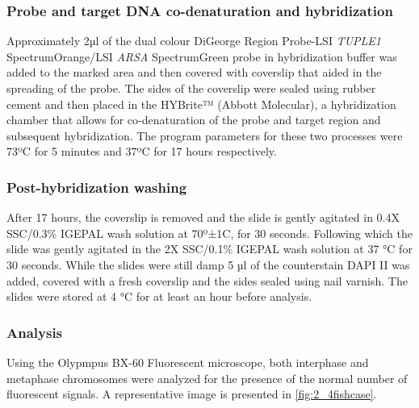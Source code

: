 \begin{refsection}
\subsubsection{Probe and target DNA co-denaturation and hybridization}
Approximately 2µl of the dual colour DiGeorge Region Probe-LSI \textit{TUPLE1} SpectrumOrange/LSI \textit{ARSA} SpectrumGreen probe in hybridization buffer was added to the marked area and then covered with coverslip that aided in the spreading of the probe. The sides of the coverslip were sealed using rubber cement and then placed in the HYBrite™ (Abbott Molecular), a hybridization chamber that allows for co-denaturation of the probe and target region and subsequent hybridization. The program parameters for these two processes were 73ºC for 5 minutes and 37ºC for 17 hours respectively.

\subsubsection{Post-hybridization washing}

After 17 hours, the coverslip is removed and the slide is gently agitated in 0.4X SSC/0.3\% IGEPAL wash solution at 70º±1C, for 30 seconds. Following which the slide was gently agitated in the 2X SSC/0.1\% IGEPAL wash solution at 37 °C for 30 seconds. While the slides were still damp 5 µl of the counterstain DAPI II was added, covered with a fresh coverslip and the sides sealed using nail varnish. The slides were stored at 4 °C for at least an hour before analysis.

\subsubsection{Analysis}

Using the Olypmpus BX-60 Fluorescent microscope, both interphase and metaphase chromosomes were analyzed for the presence of the normal number of fluorescent signals. A representative image is presented in \cref{fig:2_4fishcase}.


\end{refsection}

